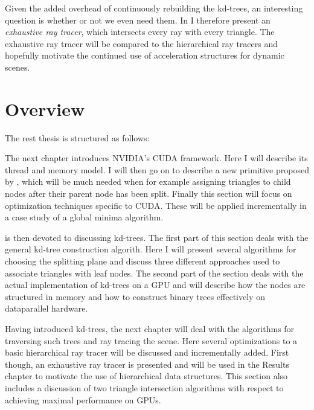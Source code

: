 Given the added overhead of continuously rebuilding the kd-trees, an interesting
question is whether or not we even need them. In  I
therefore present an \textit{exhaustive ray tracer}, which intersects every ray
with every triangle. The exhaustive ray tracer will be compared to the
hierarchical ray tracers and hopefully motivate the continued use of
acceleration structures for dynamic scenes.

\section{Overview}

The rest thesis is structured as follows:




The next chapter introduces NVIDIA's CUDA framework. Here I will describe its
thread and memory model. I will then go on to describe a new primitive proposed
by \sengupta{}, which will be much needed when for example assigning triangles
to child nodes after their parent node has been split. Finally this section will
focus on optimization techniques specific to CUDA. These will be applied
incrementally in a case study of a global minima algorithm.


 is then devoted to discussing kd-trees. The first part
of this section deals with the general kd-tree construction algorith. Here I
will present several algorithms for choosing the splitting plane and discuss
three different approaches used to associate triangles with leaf nodes. The
second part of the section deals with the actual implementation of kd-trees on a
GPU and will describe how the nodes are structured in memory and how to
construct binary trees effectively on dataparallel hardware.


Having introduced kd-trees, the next chapter will deal with the algorithms for
traversing such trees and ray tracing the scene. Here several optimizations to a
basic hierarchical ray tracer will be discussed and incrementally added. First
though, an exhaustive ray tracer is presented and will be used in the Results
chapter to motivate the use of hierarchical data structures. This section also
includes a discussion of two triangle intersection algorithms with respect to
achieving maximal performance on GPUs.

